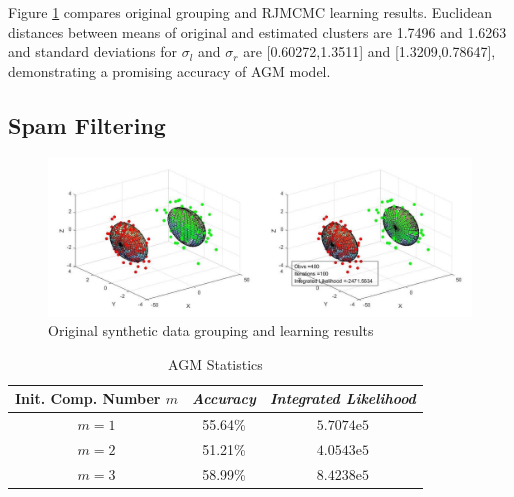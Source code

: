 \documentclass[conference]{IEEEtran}
\begin{document}
Figure \ref{fig:1} compares original grouping and RJMCMC learning results. Euclidean distances between means of original and estimated clusters are 1.7496 and 1.6263 and standard deviations for $\sigma_l$ and $\sigma_r$ are [0.60272,1.3511] and [1.3209,0.78647], demonstrating a promising accuracy of AGM model.

\subsection{Spam Filtering}
\begin{figure}[b]
\centering
\includegraphics[width=0.45\paperwidth]{syn.jpg}
\caption{Original synthetic data grouping and learning results}
\label{fig:1}
\end{figure}

\begin{table}[b]
\caption{AGM Statistics}
\begin{center}
\begin{tabular}{|c|c|c|}
\hline
\multicolumn{1}{|p{2cm}|}{\centering \textbf{Init. Comp. Number $m$}} & \multicolumn{1}{|p{2cm}|}{\centering \textbf{\textit{Accuracy}}} & \multicolumn{1}{|p{2cm}|}{\centering \textbf{\textit{Integrated Likelihood}}}\\
\hline
$m=1$ & 55.64\% & $5.7074\mathrm{e}{5}$\\
$m=2$ & 51.21\% & $4.0543\mathrm{e}{5}$ \\
$m=3$ & 58.99\% & $8.4238\mathrm{e}{5}$ \\
\hline
\end{tabular}
\label{tab1}
\end{center}
\end{table}
\end{document}
